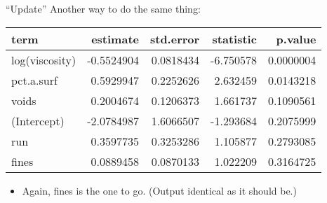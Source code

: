 \begin{frame}[fragile]{``Update''}
\protect\hypertarget{update}{}
Another way to do the same thing:

\begin{Shaded}
\begin{Highlighting}[]
\NormalTok{ \textless{}{-}}\StringTok{ }\OperatorTok{\textasciitilde{}}\StringTok{ }\OperatorTok{{-}}\StringTok{ }
\NormalTok{) }\OperatorTok{\%\textgreater{}\%}\StringTok{ }
\end{Highlighting}
\end{Shaded}

\begin{longtable}[]{@{}lrrrr@{}}
\toprule
term & estimate & std.error & statistic & p.value\tabularnewline
\midrule
\endhead
log(viscosity) & -0.5524904 & 0.0818434 & -6.750578 &
0.0000004\tabularnewline
pct.a.surf & 0.5929947 & 0.2252626 & 2.632459 & 0.0143218\tabularnewline
voids & 0.2004674 & 0.1206373 & 1.661737 & 0.1090561\tabularnewline
(Intercept) & -2.0784987 & 1.6066507 & -1.293684 &
0.2075999\tabularnewline
run & 0.3597735 & 0.3253286 & 1.105877 & 0.2793085\tabularnewline
fines & 0.0889458 & 0.0870133 & 1.022209 & 0.3164725\tabularnewline
\bottomrule
\end{longtable}

\begin{itemize}
\tightlist
\item
  Again, fines is the one to go. (Output identical as it should be.)
\end{itemize}
\end{frame}

